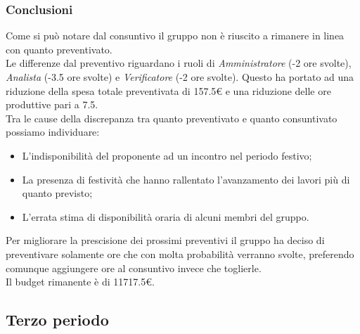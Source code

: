 \subsubsection{Conclusioni}
Come si può notare dal consuntivo il gruppo non è riuscito a rimanere in linea con quanto preventivato.
\\Le differenze dal preventivo riguardano i ruoli di \textit{Amministratore} (-2 ore svolte), \textit{Analista} (-3.5 ore svolte) e \textit{Verificatore} (-2 ore svolte).
Questo ha portato ad una riduzione della spesa totale preventivata di 157.5€ e una riduzione delle ore produttive pari a 7.5.
\\Tra le cause della discrepanza tra quanto preventivato e quanto consuntivato possiamo individuare:
    \begin{itemize}
        \item L'indisponibilità del proponente ad un incontro nel periodo festivo;
        \item La presenza di festività che hanno rallentato l'avanzamento dei lavori più di quanto previsto;
        \item L'errata stima di disponibilità oraria di alcuni membri del gruppo.
    \end{itemize}
Per migliorare la prescisione dei prossimi preventivi il gruppo ha deciso di preventivare solamente ore che con molta probabilità verranno svolte,
preferendo comunque aggiungere ore al consuntivo invece che toglierle.
\\Il budget rimanente è di \num{11717,5}€.



\subsection{Terzo periodo}

